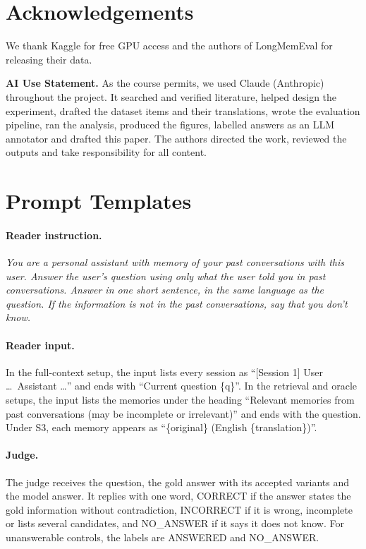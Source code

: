 \documentclass[11pt]{article}
\begin{document}
\section*{Acknowledgements}
We thank Kaggle for free GPU access and the authors of LongMemEval for releasing their data.

\noindent\textbf{AI Use Statement.}
As the course permits, we used Claude (Anthropic) throughout the project.
It searched and verified literature, helped design the experiment, drafted the dataset items and their translations, wrote the evaluation pipeline, ran the analysis, produced the figures, labelled answers as an LLM annotator and drafted this paper.
The authors directed the work, reviewed the outputs and take responsibility for all content.



\appendix

\section{Prompt Templates}
\label{app:prompts}
\small
\paragraph{Reader instruction.}
\emph{You are a personal assistant with memory of your past conversations with this user. Answer the user's question using only what the user told you in past conversations. Answer in one short sentence, in the same language as the question. If the information is not in the past conversations, say that you don't know.}

\paragraph{Reader input.}
In the full-context setup, the input lists every session as ``[Session 1] User \ldots\ Assistant \ldots'' and ends with ``Current question \{q\}''.
In the retrieval and oracle setups, the input lists the memories under the heading ``Relevant memories from past conversations (may be incomplete or irrelevant)'' and ends with the question.
Under S3, each memory appears as ``\{original\} (English \{translation\})''.

\paragraph{Judge.}
The judge receives the question, the gold answer with its accepted variants and the model answer.
It replies with one word, CORRECT if the answer states the gold information without contradiction, INCORRECT if it is wrong, incomplete or lists several candidates, and NO\_ANSWER if it says it does not know.
For unanswerable controls, the labels are ANSWERED and NO\_ANSWER.
\end{document}
